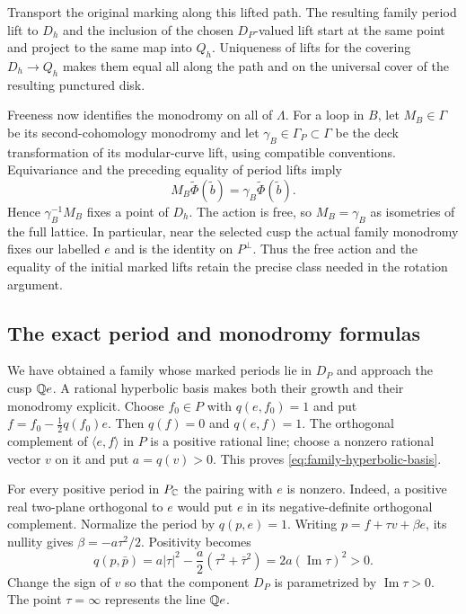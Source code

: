 Transport the original marking along this lifted path.  The
resulting family period lift to $D_h$ and the inclusion of the
chosen $D_P$-valued lift start at the same point and project to
the same map into $Q_h$.  Uniqueness of lifts for the covering
$D_h\to Q_h$ makes them equal all along the path and on the
universal cover of the resulting punctured disk.

Freeness now identifies the monodromy on all of $\Lambda$.
For a loop in $B$, let $M_B\in\Gamma$ be its
second-cohomology monodromy and let $\gamma_B\in\Gamma_P\subset
\Gamma$ be the deck transformation of its modular-curve lift,
using compatible conventions.  Equivariance and the preceding
equality of period lifts imply
\[
 M_B\widetilde\Phi(\widetilde b)
       =\gamma_B\widetilde\Phi(\widetilde b).
\]
Hence $\gamma_B^{-1}M_B$ fixes a point of $D_h$.  The action is
free, so $M_B=\gamma_B$ as isometries of the full lattice.
In particular, near the selected cusp the actual family
monodromy fixes our labelled $e$ and is the identity on $P^\perp$.
Thus the free action and the equality of the initial marked lifts
retain the precise class needed in the rotation argument.

\subsection{The exact period and monodromy formulas}

We have obtained a family whose marked periods lie in $D_P$ and
approach the cusp $\mathbb Q e$.  A rational hyperbolic basis makes both
their growth and their monodromy explicit.  Choose $f_0\in P$
with $q(e,f_0)=1$ and put
$f=f_0-\frac12q(f_0)e$.  Then $q(f)=0$ and $q(e,f)=1$.
The orthogonal complement of $\langle e,f\rangle$ in $P$ is a
positive rational line; choose a nonzero rational vector $v$ on
it and put $a=q(v)>0$.  This proves
\eqref{eq:family-hyperbolic-basis}.

For every positive period in $P_{\mathbb C}$ the pairing with $e$ is
nonzero.  Indeed, a positive real two-plane orthogonal to $e$
would put $e$ in its negative-definite orthogonal complement.
Normalize the period by $q(p,e)=1$.  Writing
$p=f+\tau v+\beta e$, its nullity gives
$\beta=-a\tau^2/2$.  Positivity becomes
\[
 q(p,\bar p)=a|\tau|^2-\frac a2(\tau^2+\bar\tau^2)
            =2a(\operatorname{Im}\tau)^2>0.
\]
Change the sign of $v$ so that the component $D_P$ is parametrized
by $\operatorname{Im}\tau>0$.  The point $\tau=\infty$ represents
the line $\mathbb Q e$.

